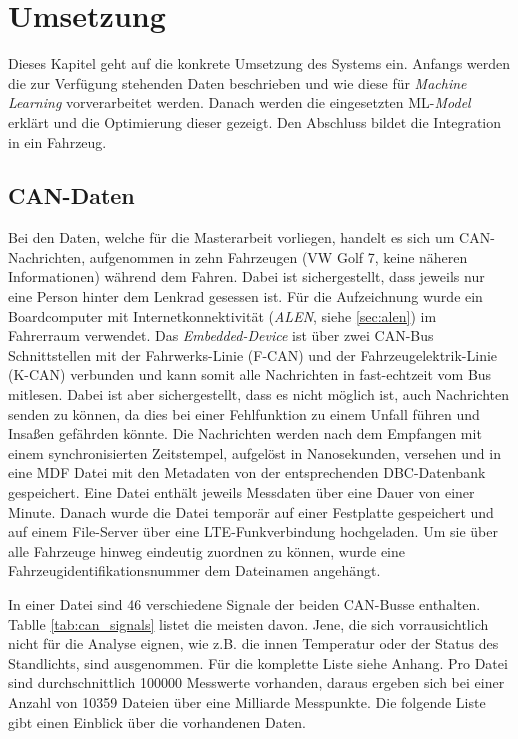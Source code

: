 %
%
%
%
%


\chapter{Umsetzung}
\label{chap:back}

Dieses Kapitel geht auf die konkrete Umsetzung des Systems ein. Anfangs werden die zur Verfügung stehenden Daten beschrieben und wie diese für \textit{Machine Learning} vorverarbeitet werden. Danach werden die eingesetzten ML-\textit{Model} erklärt und die Optimierung dieser gezeigt. Den Abschluss bildet die Integration in ein Fahrzeug.

\section{CAN-Daten}
\label{sec:data_description}

Bei den Daten, welche für die Masterarbeit vorliegen, handelt es sich um CAN-Nachrichten, aufgenommen in zehn Fahrzeugen (VW Golf 7, keine näheren Informationen) während dem Fahren. Dabei ist sichergestellt, dass jeweils nur eine Person hinter dem Lenkrad gesessen ist. Für die Aufzeichnung wurde ein Boardcomputer mit Internetkonnektivität (\textit{ALEN}, siehe \ref{sec:alen}) im Fahrerraum verwendet. Das \textit{Embedded-Device} ist über zwei CAN-Bus Schnittstellen mit der Fahrwerks-Linie (F-CAN) und der Fahrzeugelektrik-Linie (K-CAN) verbunden und kann somit alle Nachrichten in fast-echtzeit vom Bus mitlesen. Dabei ist aber sichergestellt, dass es nicht möglich ist, auch Nachrichten senden zu können, da dies bei einer Fehlfunktion zu einem Unfall führen und Insaßen gefährden könnte. Die Nachrichten werden nach dem Empfangen mit einem synchronisierten Zeitstempel, aufgelöst in Nanosekunden, versehen und in eine MDF Datei mit den Metadaten von der entsprechenden DBC-Datenbank gespeichert. Eine Datei enthält jeweils Messdaten über eine Dauer von einer Minute. Danach wurde die Datei temporär auf einer Festplatte gespeichert und auf einem File-Server über eine LTE-Funkverbindung hochgeladen. Um sie über alle Fahrzeuge hinweg eindeutig zuordnen zu können, wurde eine Fahrzeugidentifikationsnummer dem Dateinamen angehängt.

In einer Datei sind 46 verschiedene Signale der beiden CAN-Busse enthalten. Tablle \ref{tab:can_signals} listet die meisten davon. Jene, die sich vorrausichtlich nicht für die Analyse eignen, wie z.B. die innen Temperatur oder der Status des Standlichts, sind ausgenommen. Für die komplette Liste siehe Anhang. Pro Datei sind durchschnittlich 100000 Messwerte vorhanden, daraus ergeben sich bei einer Anzahl von 10359 Dateien über eine Milliarde Messpunkte. Die folgende Liste gibt einen Einblick über die vorhandenen Daten.


